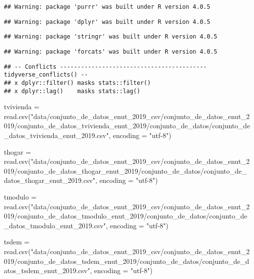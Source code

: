 \documentclass[
]{article}
\newenvironment{Shaded}{\begin{snugshade}}{\end{snugshade}}
\newcommand{\AttributeTok}[1]{\textcolor[rgb]{0.77,0.63,0.00}{#1}}
\newcommand{\FunctionTok}[1]{\textcolor[rgb]{0.00,0.00,0.00}{#1}}
\newcommand{\NormalTok}[1]{#1}
\newcommand{\OtherTok}[1]{\textcolor[rgb]{0.56,0.35,0.01}{#1}}
\newcommand{\StringTok}[1]{\textcolor[rgb]{0.31,0.60,0.02}{#1}}
\begin{document}
\begin{verbatim}
## Warning: package 'purrr' was built under R version 4.0.5
\end{verbatim}

\begin{verbatim}
## Warning: package 'dplyr' was built under R version 4.0.5
\end{verbatim}

\begin{verbatim}
## Warning: package 'stringr' was built under R version 4.0.5
\end{verbatim}

\begin{verbatim}
## Warning: package 'forcats' was built under R version 4.0.5
\end{verbatim}

\begin{verbatim}
## -- Conflicts ------------------------------------------ tidyverse_conflicts() --
## x dplyr::filter() masks stats::filter()
## x dplyr::lag()    masks stats::lag()
\end{verbatim}

\begin{Shaded}
\begin{Highlighting}[]
\NormalTok{tvivienda }\OtherTok{=} \FunctionTok{read.csv}\NormalTok{(}\StringTok{"data/conjunto\_de\_datos\_enut\_2019\_csv/conjunto\_de\_datos\_enut\_2019/conjunto\_de\_datos\_tvivienda\_enut\_2019/conjunto\_de\_datos/conjunto\_de\_datos\_tvivienda\_enut\_2019.csv"}\NormalTok{,}
                     \AttributeTok{encoding =} \StringTok{"utf{-}8"}\NormalTok{)}

\NormalTok{thogar }\OtherTok{=} \FunctionTok{read.csv}\NormalTok{(}\StringTok{"data/conjunto\_de\_datos\_enut\_2019\_csv/conjunto\_de\_datos\_enut\_2019/conjunto\_de\_datos\_thogar\_enut\_2019/conjunto\_de\_datos/conjunto\_de\_datos\_thogar\_enut\_2019.csv"}\NormalTok{,}
                  \AttributeTok{encoding =} \StringTok{"utf{-}8"}\NormalTok{)}

\NormalTok{tmodulo }\OtherTok{=} \FunctionTok{read.csv}\NormalTok{(}\StringTok{"data/conjunto\_de\_datos\_enut\_2019\_csv/conjunto\_de\_datos\_enut\_2019/conjunto\_de\_datos\_tmodulo\_enut\_2019/conjunto\_de\_datos/conjunto\_de\_datos\_tmodulo\_enut\_2019.csv"}\NormalTok{,}
                 \AttributeTok{encoding =} \StringTok{"utf{-}8"}\NormalTok{)}

\NormalTok{tsdem }\OtherTok{=} \FunctionTok{read.csv}\NormalTok{(}\StringTok{"data/conjunto\_de\_datos\_enut\_2019\_csv/conjunto\_de\_datos\_enut\_2019/conjunto\_de\_datos\_tsdem\_enut\_2019/conjunto\_de\_datos/conjunto\_de\_datos\_tsdem\_enut\_2019.csv"}\NormalTok{,}
                   \AttributeTok{encoding =} \StringTok{"utf{-}8"}\NormalTok{)}
\end{Highlighting}
\end{Shaded}
\end{document}
